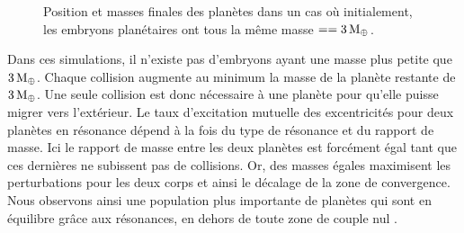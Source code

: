 \begin{figure}[htbp]
\centering
{}\hfill
{}

\caption{Position et masses finales des planètes dans un cas où initialement, les embryons planétaires ont tous la même masse $==3\mathrm{\thinspace M_\oplus}$.}\label{fig:HSE_equal_mass_influence}
\end{figure}

Dans ces simulations, il n'existe pas d'embryons ayant une masse plus petite que $3\mathrm{\thinspace M_\oplus}$. Chaque collision augmente au minimum la masse de la planète restante de $3\mathrm{\thinspace M_\oplus}$. Une seule collision est donc nécessaire à une planète pour qu'elle puisse migrer vers l'extérieur. Le taux d'excitation mutuelle des excentricités pour deux planètes en résonance dépend à la fois du type de résonance et du rapport de masse. Ici le rapport de masse entre les deux planètes est forcément égal tant que ces dernières ne subissent pas de collisions. Or, des masses égales maximisent les perturbations pour les deux corps et ainsi le décalage de la zone de convergence. Nous observons ainsi une population plus importante de planètes qui sont en équilibre grâce aux résonances, en dehors de toute zone de couple nul . 

